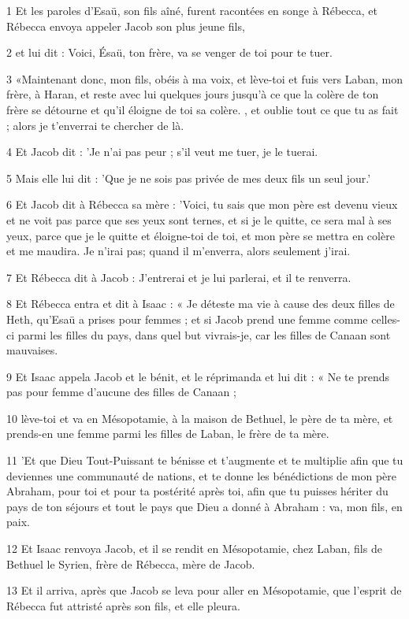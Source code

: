 \par 1 Et les paroles d'Esaü, son fils aîné, furent racontées en songe à Rébecca, et Rébecca envoya appeler Jacob son plus jeune fils,
\par 2 et lui dit : Voici, Ésaü, ton frère, va se venger de toi pour te tuer.
\par 3 «Maintenant donc, mon fils, obéis à ma voix, et lève-toi et fuis vers Laban, mon frère, à Haran, et reste avec lui quelques jours jusqu'à ce que la colère de ton frère se détourne et qu'il éloigne de toi sa colère. , et oublie tout ce que tu as fait ; alors je t'enverrai te chercher de là.
\par 4 Et Jacob dit : 'Je n'ai pas peur ; s'il veut me tuer, je le tuerai.
\par 5 Mais elle lui dit : 'Que je ne sois pas privée de mes deux fils un seul jour.'
\par 6 Et Jacob dit à Rébecca sa mère : 'Voici, tu sais que mon père est devenu vieux et ne voit pas parce que ses yeux sont ternes, et si je le quitte, ce sera mal à ses yeux, parce que je le quitte et éloigne-toi de toi, et mon père se mettra en colère et me maudira. Je n'irai pas; quand il m’enverra, alors seulement j’irai.
\par 7 Et Rébecca dit à Jacob : J'entrerai et je lui parlerai, et il te renverra.
\par 8 Et Rébecca entra et dit à Isaac : « Je déteste ma vie à cause des deux filles de Heth, qu'Esaü a prises pour femmes ; et si Jacob prend une femme comme celles-ci parmi les filles du pays, dans quel but vivrais-je, car les filles de Canaan sont mauvaises.
\par 9 Et Isaac appela Jacob et le bénit, et le réprimanda et lui dit : « Ne te prends pas pour femme d'aucune des filles de Canaan ;
\par 10 lève-toi et va en Mésopotamie, à la maison de Bethuel, le père de ta mère, et prends-en une femme parmi les filles de Laban, le frère de ta mère.
\par 11 'Et que Dieu Tout-Puissant te bénisse et t'augmente et te multiplie afin que tu deviennes une communauté de nations, et te donne les bénédictions de mon père Abraham, pour toi et pour ta postérité après toi, afin que tu puisses hériter du pays de ton séjours et tout le pays que Dieu a donné à Abraham : va, mon fils, en paix.
\par 12 Et Isaac renvoya Jacob, et il se rendit en Mésopotamie, chez Laban, fils de Bethuel le Syrien, frère de Rébecca, mère de Jacob.
\par 13 Et il arriva, après que Jacob se leva pour aller en Mésopotamie, que l'esprit de Rébecca fut attristé après son fils, et elle pleura.
